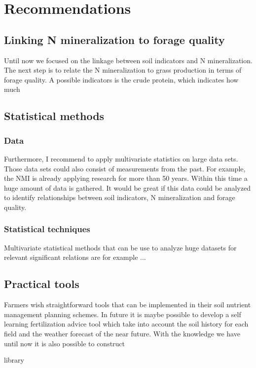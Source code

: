 \documentclass[10pt,twoside,dutch,english]{report}
\begin{document}
	
\chapter{Recommendations}
	\section{Linking N mineralization to forage quality}
Until now we focused on the linkage between soil indicators and N mineralization. The next step is to relate the N mineralization to grass production in terms of forage quality. A possible indicators is the crude protein, which indicates how much 

	 \section{Statistical methods}
	 \subsection{Data}
Furthermore, I recommend to apply multivariate statistics on large data sets. Those data sets could also consist of measurements from the past. For example, the NMI is already applying research for more than 50 years. Within this time a huge amount of data is gathered. It would be great if this data could be analyzed to identify relationships between soil indicators, N mineralization and forage quality. 
	\subsection{Statistical techniques}
	Multivariate statistical methods that can be use to analyze huge datasets for relevant significant relations are for example ...
	
	\section{Practical tools}
	Farmers wish straightforward tools that can be implemented in their soil nutrient management planning schemes. In future it is maybe possible to develop a self learning fertilization advice tool which take into account the soil history for each field and the weather forecast of the near future. With the knowledge we have until now it is also possible to construct
	




\footnotesize 

 {library}
\normalsize 
\end{document}
